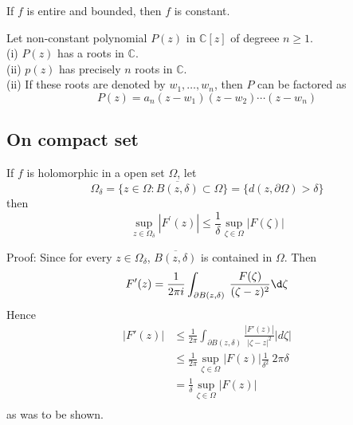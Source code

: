 \documentclass[12pt, oneside]{book}
\begin{document}
\begin{corollary}
    If $f$ is entire and bounded, then $f$ is constant.
\end{corollary}
\begin{corollary}
    Let non-constant polynomial $P(z)$ in $\mathbb{C}[z]$ of degreee $n\geq 1$.\\
    (i) $P(z)$ has a roots in $\mathbb{C}$.\\
    (ii) $p(z)$ has precisely $n$ roots in $\mathbb{C}$.\\
    (ii) If these roots are denoted by $w_1,\ldots,w_n$, then  $P$ can be factored as
    $$P(z)=a_n(z-w_1)(z-w_2)\cdots(z-w_n)$$

\end{corollary}

\subsection{On compact set}
\begin{theorem}
    If $f$ is holomorphic in a open set $\Omega$, let
    $$\Omega_{\delta}
        =\{z\in \Omega:\overline{B(z,\delta)}\subset\Omega\}
        =\{d(z,\partial\Omega)>\delta\}$$
    then
    $$\sup_{z\in\Omega_\delta}\left|F^{\prime}(z)\right|\leq\frac{1}{\delta}\sup_{\zeta\in\Omega}\left|F(\zeta)\right|$$

    Proof: Since for every $z\in\Omega_\delta$, $\overline{B(z,\delta)}$ is contained in $\Omega$. Then
    $$F'(z)=\frac{1}{2\pi i}\int_{\partial B(z,\delta)}\:\frac{F(\zeta)}{(\zeta-z)^2}\d \zeta$$
    Hence
    $$\begin{aligned}
            \left|F'(z)\right| & \leq\frac{1}{2\pi}\int_{\partial B(z,\delta)}\frac{\left|F'(z)\right|}{\left|\zeta-z\right|^2}\left|d\zeta\right| \\
                               & \leq\frac{1}{2\pi}\sup_{\zeta\in\Omega}\left|F(z)\right|\frac{1}{\delta^2}\:2\pi\delta                            \\
                               & =\frac{1}{\delta}\sup_{\zeta\in\Omega}\left|F(z)\right|                                                           \\
        \end{aligned}$$
    as was to be shown.
\end{theorem}
\end{document}
